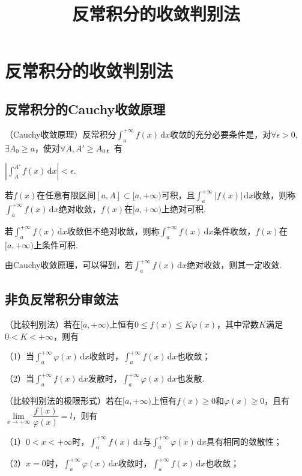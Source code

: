 \documentclass{ctexbook}
\title{反常积分的收敛判别法}
\begin{document}
	\section*{反常积分的收敛判别法}
	\subsection*{反常积分的Cauchy收敛原理}
	（Cauchy收敛原理）反常积分$\displaystyle\int_{a}^{+\infty}f(x)\,\mathrm{d} x$收敛的充分必要条件是，对$\forall \epsilon >0$,$\exists A_0 \ge a$，使对$\forall A,A' \ge A_0$，有
	
	\centerline{$|\displaystyle\int_{A}^{A'}f(x)\,\mathrm{d} x|<\epsilon$.}
	
	若$f(x)$在任意有限区间$[a,A]\subset [a,+\infty)$可积，且$\displaystyle\int_{a}^{+\infty}|f(x)|\,\mathrm{d} x$收敛，则称$\displaystyle\int_{a}^{+\infty}f(x)\,\mathrm{d} x$绝对收敛，$f(x)$在$[a,+\infty)$上绝对可积.
	
	若$\displaystyle\int_{a}^{+\infty}f(x)\,\mathrm{d} x$收敛但不绝对收敛，则称$\displaystyle\int_{a}^{+\infty}f(x)\,\mathrm{d} x$条件收敛，$f(x)$在$[a,+\infty)$上条件可积.
	
	由Cauchy收敛原理，可以得到，若$\displaystyle\int_{a}^{+\infty}f(x)\,\mathrm{d} x$绝对收敛，则其一定收敛.
	
	\subsection*{非负反常积分审敛法}
	（比较判别法）若在$[a,+\infty)$上恒有$0\le f(x)\le K\varphi (x)$，其中常数$K$满足$0<K<+\infty$，则有
	
	（1）当$\displaystyle\int_{a}^{+\infty}\varphi(x)\,\mathrm{d} x$收敛时，$\displaystyle\int_{a}^{+\infty}f(x)\,\mathrm{d} x$也收敛；
	
	（2）当$\displaystyle\int_{a}^{+\infty}f(x)\,\mathrm{d} x$发散时，$\displaystyle\int_{a}^{+\infty}\varphi(x)\,\mathrm{d} x$也发散.
	
	\hspace*{\fill}
	
	（比较判别法的极限形式）若在$[a,+\infty)$上恒有$f(x)\ge 0$和$\varphi (x)\ge 0$，且有$\lim\limits_{x\rightarrow +\infty}\dfrac{f(x)}{\varphi (x)}=l$，则有
	
	（1）$0<x<+\infty$时，$\displaystyle\int_{a}^{+\infty}f(x)\,\mathrm{d} x$与$\displaystyle\int_{a}^{+\infty}\varphi(x)\,\mathrm{d} x$具有相同的敛散性；
	
	（2）$x=0$时，$\displaystyle\int_{a}^{+\infty}\varphi(x)\,\mathrm{d} x$收敛时，$\displaystyle\int_{a}^{+\infty}f(x)\,\mathrm{d} x$也收敛；
	
\end{document}
